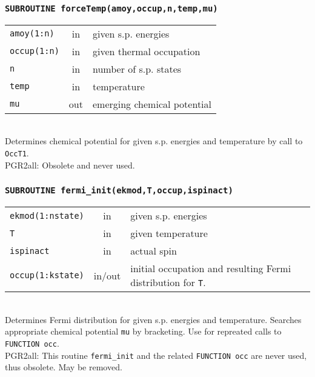 \documentclass[final,1p]{elsarticle}
\newcommand{\PGRcomm}[1]{{\color{blue}\small PGR2all: #1}}
\begin{document}
\subsubsection*{\tt SUBROUTINE forceTemp(amoy,occup,n,temp,mu)}
\begin{tabular}{lcl}
 {\tt amoy(1:n)} & in & given s.p. energies\\
 {\tt occup(1:n)} & in & given thermal occupation\\
 {\tt n} & in & number of s.p. states\\
 {\tt temp} & in & temperature\\
 {\tt mu} & out & emerging chemical potential\\
\end{tabular}
\\[4pt]
Determines chemical potential for given s.p. energies and temperature
by call to {\tt OccT1}.
\\
\PGRcomm{Obsolete and never used.}




\subsubsection*{\tt SUBROUTINE fermi\_init(ekmod,T,occup,ispinact)}
\begin{tabular}{lcl}
 {\tt ekmod(1:nstate)} & in & given s.p. energies\\
 {\tt T} & in & given temperature\\
 {\tt ispinact} & in & actual spin\\
 {\tt occup(1:kstate)} & in/out & initial occupation and resulting
 Fermi distribution for {\tt T}.\\
\end{tabular}
\\[4pt]
Determines Fermi distribution for given s.p. energies and
temperature. Searches appropriate chemical potential {\tt mu} by
bracketing. Use for repreated calls to {\tt FUNCTION occ}.
\\
\PGRcomm{This routine {\tt fermi\_init} and the related
{\tt FUNCTION occ} are never used, thus obsolete. May be removed.}
\end{document}
